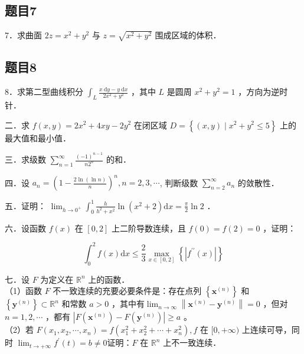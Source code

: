 \documentclass{article}
\begin{document}
\subsection{题目7}
7．求曲面 \(2 z=x^{2}+y^{2}\) 与 \(z=\sqrt{x^{2}+y^{2}}\) 围成区域的体积．

\subsection{题目8}
8．求第二型曲线积分 \(\int_{L} \frac{x \mathrm{~d} y-y \mathrm{~d} x}{2 x^{2}+y^{2}}\) ，其中 \(L\) 是圆周 \(x^{2}+y^{2}=1\) ，方向为逆时针．

二．求 \(f(x, y)=2 x^{2}+4 x y-2 y^{2}\) 在闭区域 \(D=\left\{(x, y) \mid x^{2}+y^{2} \leq 5\right\}\) 上的最大值和最小值．

三．求级数 \(\sum_{n=1}^{\infty} \frac{(-1)^{n-1}}{n 2^{n}}\) 的和．

四．设 \(a_{n}=\left(1-\frac{2 \ln (\ln n)}{n}\right)^{n}, n=2,3, \cdots\), 判断级数 \(\sum_{n=2}^{\infty} a_{n}\) 的敛散性．

五．证明： \(\lim _{h \rightarrow 0^{+}} \int_{0}^{1} \frac{h}{h^{2}+x^{2}} \ln \left(x^{2}+2\right) \mathrm{d} x=\frac{\pi}{2} \ln 2\) ．

六．设函数 \(f(x)\) 在 \([0,2]\) 上二阶导数连续，且 \(f(0)=f(2)=0\) ，证明：

\[
\int_{0}^{2} f(x) \mathrm{d} x \leq \frac{2}{3} \max _{x \in[0,2]}\left\{\left|f^{\prime \prime}(x)\right|\right\}
\]

七．设 \(F\) 为定义在 \(\mathbb{R}^{n}\) 上的函数．\\
（1）函数 \(F\) 不一致连续的充要必要条件是：存在点列 \(\left\{\mathbf{x}^{(n)}\right\}\) 和 \(\left\{\mathbf{y}^{(n)}\right\} \subset \mathbb{R}^{n}\) 和常数 \(a>0\) ，其中有\(\lim _{n \rightarrow \infty}\left\|\mathbf{x}^{(n)}-\mathbf{y}^{(n)}\right\|=0\) ，但对 \(n=1,2, \cdots\) ，都有 \(\left|F\left(\mathbf{x}^{(n)}\right)-F\left(\mathbf{y}^{(n)}\right)\right| \geq a\) 。\\
（2）若 \(F\left(x_{1}, x_{2}, \cdots, x_{n}\right)=f\left(x_{1}^{2}+x_{2}^{2}+\cdots+x_{n}^{2}\right), f\) 在 \([0,+\infty)\) 上连续可导，同时 \(\lim _{t \rightarrow+\infty} f^{\prime}(t)=b \neq 0\)证明：\(F\) 在 \(\mathbb{R}^{n}\) 上不一致连续．
\end{document}
